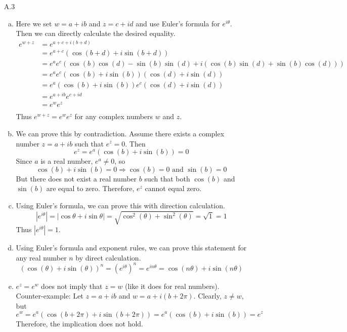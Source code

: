 \documentclass[../../Solutions.tex]{subfiles}
\begin{document}
\begin{itemize}
	\item [A.3] 
		\begin{enumerate}[(a)]
			\item Here we set $w = a+ib$ and $z = c+id$ and use Euler's formula for $e^{i\theta}$.
			Then we can directly calculate the desired equality.
			\begin{equation*} \begin{split}
				e^{w+z} & = e^{a+c+i(b+d)} \\
						& = e^{a+c}(\cos(b+d)+i\sin(b+d)) \\
						& = e^ae^c(\cos(b)\cos(d)-\sin(b)\sin(d)+i(\cos(b)\sin(d)+\sin(b)\cos(d))) \\
						& = e^ae^c(\cos(b)+i\sin(b))(\cos(d)+i\sin(d)) \\
						& = e^a(\cos(b)+i\sin(b))e^c(\cos(d)+i\sin(d)) \\
						& = e^{a+ib}e^{c+id} \\
						& = e^we^z \\
			\end{split} \end{equation*}
			Thus $e^{w+z}=e^we^z$ for any complex numbers $w$ and $z$.
			
			\item We can prove this by contradiction.
			Assume there exists a complex number $z = a+ib$ such that $e^z=0$.
			Then
			$$ e^z = e^a(\cos(b)+i\sin(b)) = 0 $$
			Since $a$ is a real number, $e^a \neq 0$, so
			$$ \cos(b)+i\sin(b) = 0 \Rightarrow \cos(b) = 0 \text{ and } \sin(b) = 0 $$
			But there does not exist a real number $b$ such that both $\cos(b)$ and $\sin(b)$ are equal to zero.
			Therefore, $e^z$ cannot equal zero.
			
			\item Using Euler's formula, we can prove this with direction calculation.
			\begin{equation*}
			|e^{i\theta}| = |\cos{\theta}+i\sin{\theta}| = \sqrt{ \cos^2(\theta)+\sin^2(\theta) } = \sqrt{1} = 1
			\end{equation*}
			Thus $|e^{i\theta}| = 1$.
			
			\item Using Euler's formula and exponent rules, we can prove this statement for any real number $n$ by direct calculation.
			$$ (\cos(\theta)+i\sin(\theta))^n = (e^{i\theta})^n = e^{in\theta} = \cos(n\theta)+i\sin(n\theta) $$
			
			\item $e^z = e^w$ does not imply that $z = w$ (like it does for real numbers).
			Counter-example: Let $z = a+ib$ and $w = a+i(b+2\pi)$.
			Clearly, $z \neq w$, but
			$$ e^w = e^a(\cos(b+2\pi)+i\sin(b+2\pi)) = e^a(\cos(b)+i\sin(b)) = e^z $$
			Therefore, the implication does not hold.
		\end{enumerate}
\end{itemize}
\end{document}
